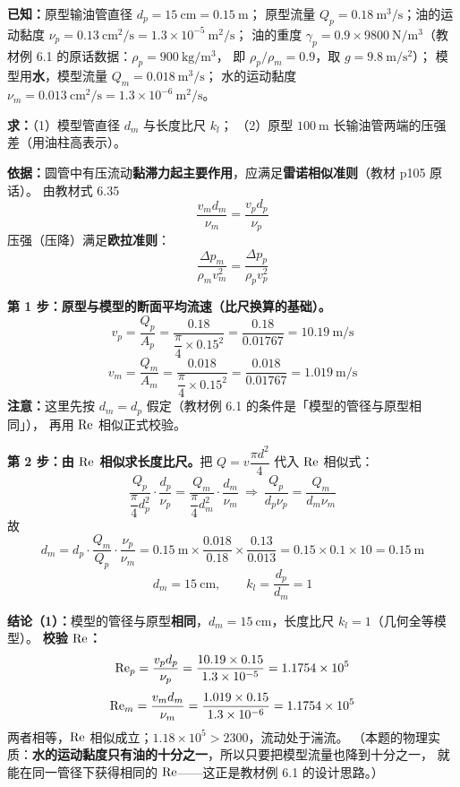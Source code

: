 \begin{jie}
\textbf{已知：}原型输油管直径 $d_p=15\ \mathrm{cm}=0.15\ \mathrm{m}$；
原型流量 $Q_p=0.18\ \mathrm{m^{3}/s}$；油的运动黏度 $\nu_p=0.13\ \mathrm{cm^{2}/s}=1.3\times10^{-5}\ \mathrm{m^{2}/s}$；
油的重度 $\gamma_p=0.9\times9800\ \mathrm{N/m^{3}}$（教材例 6.1 的原话数据：$\rho_p=900\ \mathrm{kg/m^{3}}$，
即 $\rho_p/\rho_m=0.9$，取 $g=9.8\ \mathrm{m/s^{2}}$）；
模型用\textbf{水}，模型流量 $Q_m=0.018\ \mathrm{m^{3}/s}$；
水的运动黏度 $\nu_m=0.013\ \mathrm{cm^{2}/s}=1.3\times10^{-6}\ \mathrm{m^{2}/s}$。

\textbf{求：}（1）模型管直径 $d_m$ 与长度比尺 $k_l$；
（2）原型 $100\ \mathrm{m}$ 长输油管两端的压强差（用油柱高表示）。

\textbf{依据：}圆管中有压流动\textbf{黏滞力起主要作用}，应满足\textbf{雷诺相似准则}（教材 p105 原话）。
由教材式 6.35
\[ \frac{v_m d_m}{\nu_m}=\frac{v_p d_p}{\nu_p} \]
压强（压降）满足\textbf{欧拉准则}：
\[ \frac{\Delta p_m}{\rho_m v_m^{2}}=\frac{\Delta p_p}{\rho_p v_p^{2}} \]

\textbf{第 1 步：原型与模型的断面平均流速（比尺换算的基础）。}
\[ v_p=\frac{Q_p}{A_p}=\frac{0.18}{\dfrac{\pi}{4}\times0.15^{2}}
   =\frac{0.18}{0.01767}=10.19\ \mathrm{m/s} \]
\[ v_m=\frac{Q_m}{A_m}=\frac{0.018}{\dfrac{\pi}{4}\times0.15^{2}}
   =\frac{0.018}{0.01767}=1.019\ \mathrm{m/s} \]
\textbf{注意：}这里先按 $d_m=d_p$ 假定（教材例 6.1 的条件是「模型的管径与原型相同」），
再用 $\mathrm{Re}$ 相似正式校验。

\textbf{第 2 步：由 $\mathrm{Re}$ 相似求长度比尺。}把 $Q=v\dfrac{\pi d^{2}}{4}$ 代入 $\mathrm{Re}$ 相似式：
\[ \frac{Q_p}{\dfrac{\pi}{4}d_p^{2}}\cdot\frac{d_p}{\nu_p}
   =\frac{Q_m}{\dfrac{\pi}{4}d_m^{2}}\cdot\frac{d_m}{\nu_m}
   \ \Longrightarrow\ \frac{Q_p}{d_p\nu_p}=\frac{Q_m}{d_m\nu_m} \]
故
\[ d_m=d_p\cdot\frac{Q_m}{Q_p}\cdot\frac{\nu_p}{\nu_m}
   =0.15\ \mathrm{m}\times\frac{0.018}{0.18}\times\frac{0.13}{0.013}
   =0.15\times0.1\times10=0.15\ \mathrm{m} \]
\[ \boxed{\,d_m=15\ \mathrm{cm},\qquad k_l=\frac{d_p}{d_m}=1\,} \]

\textbf{结论（1）：}模型的管径与原型\textbf{相同}，$d_m=15\ \mathrm{cm}$，长度比尺 $k_l=1$（几何全等模型）。
\textbf{校验 $\mathrm{Re}$：}
\[ \mathrm{Re}_p=\frac{v_p d_p}{\nu_p}=\frac{10.19\times0.15}{1.3\times10^{-5}}
   =1.1754\times10^{5} \]
\[ \mathrm{Re}_m=\frac{v_m d_m}{\nu_m}=\frac{1.019\times0.15}{1.3\times10^{-6}}
   =1.1754\times10^{5} \]
两者相等，$\mathrm{Re}$ 相似成立；$1.18\times10^{5}>2300$，流动处于湍流。
（本题的物理实质：\textbf{水的运动黏度只有油的十分之一}，所以只要把模型流量也降到十分之一，
就能在同一管径下获得相同的 $\mathrm{Re}$——这正是教材例 6.1 的设计思路。）


\end{jie}
